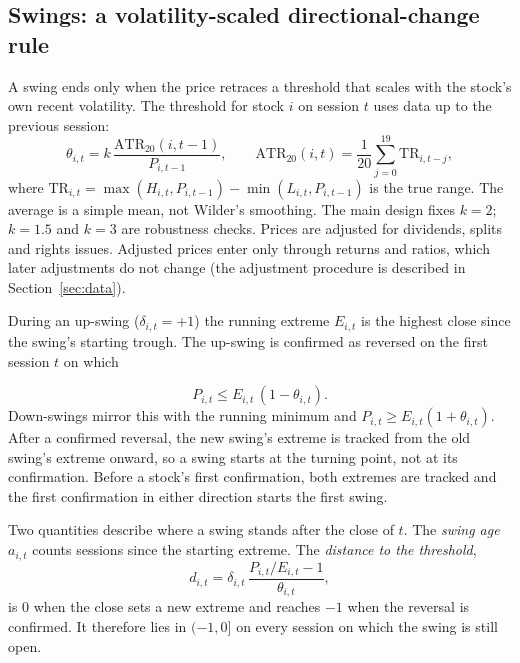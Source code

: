 \subsection{Swings: a volatility-scaled directional-change rule}\label{sec:swings}

A swing ends only when the price retraces a threshold that scales with the stock's own recent
volatility. The threshold for stock $i$ on session $t$ uses data up to the previous session:
\begin{equation}\label{eq:theta}
  \theta_{i,t} = k\,\frac{\mathrm{ATR}_{20}(i,t-1)}{P_{i,t-1}}, \qquad
  \mathrm{ATR}_{20}(i,t) = \frac{1}{20}\sum_{j=0}^{19} \mathrm{TR}_{i,t-j},
\end{equation}
where $\mathrm{TR}_{i,t}=\max(H_{i,t},P_{i,t-1})-\min(L_{i,t},P_{i,t-1})$ is the true range. The
average is a simple mean, not Wilder's smoothing. The main design fixes $k=2$; $k=1.5$ and $k=3$
are robustness checks. Prices are adjusted for dividends, splits and rights issues. Adjusted prices
enter only through returns and ratios, which later adjustments do not change (the adjustment
procedure is described in Section~\ref{sec:data}).

During an up-swing ($\delta_{i,t}=+1$) the running extreme $E_{i,t}$ is the highest close since the
swing's starting trough. The up-swing is confirmed as reversed on the first session $t$ on which

\begin{equation}\label{eq:confirm}
  P_{i,t} \le E_{i,t}\,(1-\theta_{i,t}).
\end{equation}
Down-swings mirror this with the running minimum and $P_{i,t}\ge E_{i,t}(1+\theta_{i,t})$. After a
confirmed reversal, the new swing's extreme is tracked from the old swing's extreme onward, so a
swing starts at the turning point, not at its confirmation. Before a stock's first confirmation,
both extremes are tracked and the first confirmation in either direction starts the first swing.

Two quantities describe where a swing stands after the close of $t$. The \emph{swing age}
$a_{i,t}$ counts sessions since the starting extreme. The \emph{distance to the threshold},
\begin{equation}\label{eq:dist}
  d_{i,t} = \delta_{i,t}\,\frac{P_{i,t}/E_{i,t}-1}{\theta_{i,t}},
\end{equation}
is $0$ when the close sets a new extreme and reaches $-1$ when the reversal is confirmed. It
therefore lies in $(-1,0]$ on every session on which the swing is still open.

